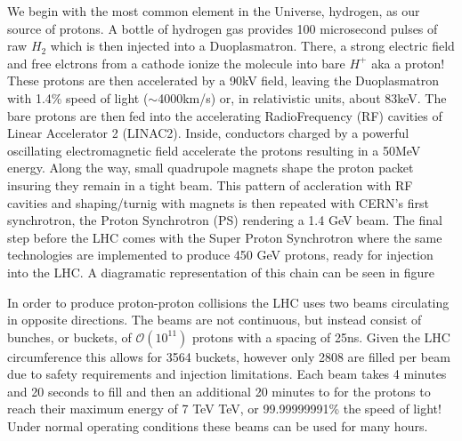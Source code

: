 We begin with the most common element in the Universe, hydrogen, as our source
of protons.  A bottle of hydrogen gas provides 100 microsecond pulses of raw
$H_{2}$ which is then injected into a Duoplasmatron. There,  a strong electric
field and free elctrons from a cathode ionize the molecule into bare $H^{+}$ aka
a proton!  These protons are then accelerated by a 90kV field, leaving the
Duoplasmatron with 1.4\% speed of light ($\sim$4000km/s) or, in relativistic
units, about 83keV. The bare protons are then fed into the accelerating
RadioFrequency (RF) cavities of Linear Accelerator 2 (LINAC2). Inside,
conductors charged by a powerful oscillating electromagnetic field accelerate
the protons resulting in a 50MeV energy. Along the way, small quadrupole magnets
shape the proton packet insuring they remain in a tight beam.  This pattern of
accleration with RF cavities and shaping/turnig with magnets is then repeated
with CERN's first synchrotron, the Proton Synchrotron (PS) rendering a 1.4 GeV
beam.  The final step before the LHC comes with the Super Proton Synchrotron
where the same technologies are implemented to produce 450 GeV protons, ready
for injection into the LHC. A diagramatic representation of this chain can be
seen in figure \cite{injection_chain} 

In order to produce proton-proton collisions the LHC uses two beams circulating
in opposite directions.  The beams are not continuous, but instead consist of
bunches, or buckets, of $\mathcal{O}(10^{11})$ protons with a spacing of 25ns.
Given the LHC circumference this allows for 3564 buckets, however only 2808 are
filled per beam due to safety requirements and injection limitations.  Each beam
takes 4 minutes and 20 seconds to fill and then an additional 20 minutes to for
the protons to reach their maximum energy of 7 TeV TeV, or 99.99999991\% the
speed of light! Under normal operating conditions these beams can be used for
many hours.
